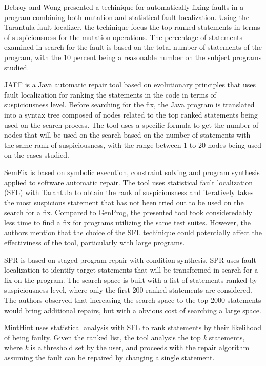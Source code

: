 \documentclass[sigplan,10pt,review,anonymous]{acmart}\settopmatter{printfolios=true,printccs=false,printacmref=false}
\begin{document}
Debroy and Wong presented a techinique for automatically
fixing faults in a program combining both mutation and statistical
fault localization. Using the Tarantula fault localizer, the
techinique focus the top ranked statements in terms of suspiciousness
for the mutation operations. The percentage of statements examined in
search for the fault is based on the total number of statements of the
program, with the 10 percent being a reasonable number on the subject
programs studied.

JAFF is a Java automatic repair tool based on evolutionary principles that uses fault localization for ranking the statements in the code in terms of suspiciousness level.
Before searching for the fix, the Java program is translated into a syntax tree composed of nodes related to the top ranked statements being used on the search process.
The tool uses a specific formula to get the number of nodes that will be used on the search based on the number of statements with the same rank of suspiciousness,
with the range between 1 to 20 nodes being used on the cases studied.

SemFix is based on symbolic execution, constraint solving and program synthesis applied to software automatic repair. The tool uses statistical fault localization (SFL) with Tarantula to
obtain the rank of suspiciousness and iteratively takes the most suspicious statement that has not been tried out to be used on the search for a fix. Compared to GenProg, the presented tool
took consideredably less time to find a fix for programs utilizing the same test suites. However, the authors mention that the choice of the SFL techinique could potentially affect the
effectiviness of the tool, particularly with large programs.

SPR  is based on staged
program repair with condition synthesis. SPR uses fault localization
to identify target statements that will be transformed in search for a
fix on the program. The search space is built with a list of
statements ranked by suspiciousness level, where only the first 200
ranked statements are considered. The authors observed that increasing
the search space to the top 2000 statements would bring additional
repairs, but with a obvious cost of searching a large space.

MintHint  uses statistical analysis with SFL to rank
statements by their likelihood of being faulty. Given the ranked list,
the tool analysis the top \textit{k} statements, where \textit{k} is a
threshold set by the user, and proceeds with the repair algorithm
assuming the fault can be repaired by changing a single statement.
\end{document}
